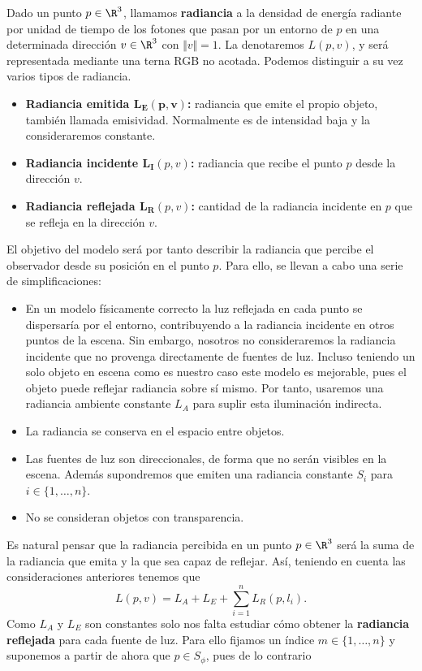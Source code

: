 \begin{definicion}[Radiancia]
    Dado un punto $p\in\R^3$, llamamos \textbf{radiancia} a la densidad de energía radiante por unidad de tiempo de los fotones que pasan por un entorno de $p$ en una determinada dirección $v\in\R^3$ con $\Vert v\Vert = 1$. La denotaremos $L(p,v)$, y será representada mediante una terna RGB no acotada. Podemos distinguir a su vez varios tipos de radiancia.
    \begin{itemize}
        \item \textbf{Radiancia emitida $\boldsymbol{L_E(p,v)}$:} radiancia que emite el propio objeto, también llamada emisividad. Normalmente es de intensidad baja y la consideraremos constante.
        \item \textbf{Radiancia incidente $\boldsymbol{L_{I}}(p,v)$:} radiancia que recibe el punto $p$ desde la dirección $v$. 
        \item \textbf{Radiancia reflejada $\boldsymbol{L_{R}}(p,v)$:} cantidad de la radiancia incidente en $p$ que se refleja en la dirección $v$. 
\end{itemize}
\end{definicion}

El objetivo del modelo será por tanto describir la radiancia que percibe el observador desde su posición en el punto $p$. Para ello, se llevan a cabo una serie de simplificaciones:
\begin{itemize}
    \item En un modelo físicamente correcto la luz reflejada en cada punto se dispersaría por el entorno, contribuyendo a la radiancia incidente en otros puntos de la escena. Sin embargo, nosotros no consideraremos la radiancia incidente que no provenga directamente de fuentes de luz. Incluso teniendo un solo objeto en escena como es nuestro caso este modelo es mejorable, pues el objeto puede reflejar radiancia sobre sí mismo. Por tanto, usaremos una radiancia ambiente constante $L_A$ para suplir esta iluminación indirecta.
    \item La radiancia se conserva en el espacio entre objetos.
    \item Las fuentes de luz son direccionales, de forma que no serán visibles en la escena. Además supondremos que emiten una radiancia constante $S_i$ para $i\in \{1,\dots, n\}$.
    \item No se consideran objetos con transparencia.
\end{itemize}
Es natural pensar que la radiancia percibida en un punto $p\in \R^3$ será la suma de la radiancia que emita y la que sea capaz de reflejar. Así, teniendo en cuenta las consideraciones anteriores tenemos que
\begin{equation*}
    L(p,v) = L_A + L_E + \sum_{i=1}^n L_R(p,l_i).
\end{equation*}
Como $L_A$ y $L_E$ son constantes solo nos falta estudiar cómo obtener la \textbf{radiancia reflejada} para cada fuente de luz. Para ello fijamos un índice $m\in \{1,\dots,n\}$ y suponemos a partir de ahora que $p\in S_{\phi}$, pues de lo contrario

